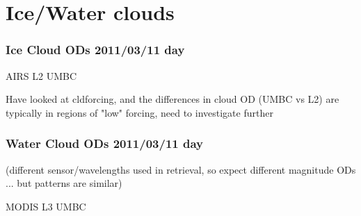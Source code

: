 \documentclass[10pt,t]{beamer}
\begin{document}
\section{Ice/Water clouds}
\begin{frame}
  \frametitle{Ice Cloud ODs 2011/03/11 day}

  \hspace{0.50in} AIRS L2 \hspace{1.75in} UMBC \\
  \begin{center}
  \end{center}

  Have looked at cldforcing, and the differences in cloud OD (UMBC vs L2)
  are typically in regions of "low" forcing, need to investigate further

\end{frame}
\begin{frame}
  \frametitle{Water Cloud ODs 2011/03/11 day}
  (different sensor/wavelengths used in retrieval, so expect different
  magnitude ODs ... but patterns are similar)

  \hspace{0.50in} MODIS L3 \hspace{1.75in} UMBC \\
  \begin{center}
  \end{center}
\end{frame}
\end{document}

